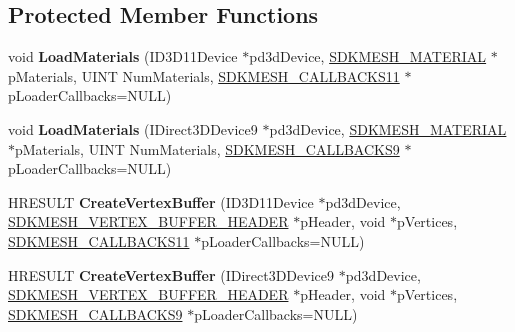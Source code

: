 \subsection*{Protected Member Functions}
\begin{DoxyCompactItemize}
\item 
\hypertarget{class_c_d_x_u_t_s_d_k_mesh_a28a515a0ddc13253ed8dc9cfb2b53b86}{void {\bfseries Load\+Materials} (I\+D3\+D11\+Device $\ast$pd3d\+Device, \hyperlink{struct_s_d_k_m_e_s_h___m_a_t_e_r_i_a_l}{S\+D\+K\+M\+E\+S\+H\+\_\+\+M\+A\+T\+E\+R\+I\+A\+L} $\ast$p\+Materials, U\+I\+N\+T Num\+Materials, \hyperlink{struct_s_d_k_m_e_s_h___c_a_l_l_b_a_c_k_s11}{S\+D\+K\+M\+E\+S\+H\+\_\+\+C\+A\+L\+L\+B\+A\+C\+K\+S11} $\ast$p\+Loader\+Callbacks=N\+U\+L\+L)}\label{class_c_d_x_u_t_s_d_k_mesh_a28a515a0ddc13253ed8dc9cfb2b53b86}

\item 
\hypertarget{class_c_d_x_u_t_s_d_k_mesh_a5f2f31bb0a688d2baa3234aef93fd95a}{void {\bfseries Load\+Materials} (I\+Direct3\+D\+Device9 $\ast$pd3d\+Device, \hyperlink{struct_s_d_k_m_e_s_h___m_a_t_e_r_i_a_l}{S\+D\+K\+M\+E\+S\+H\+\_\+\+M\+A\+T\+E\+R\+I\+A\+L} $\ast$p\+Materials, U\+I\+N\+T Num\+Materials, \hyperlink{struct_s_d_k_m_e_s_h___c_a_l_l_b_a_c_k_s9}{S\+D\+K\+M\+E\+S\+H\+\_\+\+C\+A\+L\+L\+B\+A\+C\+K\+S9} $\ast$p\+Loader\+Callbacks=N\+U\+L\+L)}\label{class_c_d_x_u_t_s_d_k_mesh_a5f2f31bb0a688d2baa3234aef93fd95a}

\item 
\hypertarget{class_c_d_x_u_t_s_d_k_mesh_a5a98aa8652190b3e17696c839028bf4b}{H\+R\+E\+S\+U\+L\+T {\bfseries Create\+Vertex\+Buffer} (I\+D3\+D11\+Device $\ast$pd3d\+Device, \hyperlink{struct_s_d_k_m_e_s_h___v_e_r_t_e_x___b_u_f_f_e_r___h_e_a_d_e_r}{S\+D\+K\+M\+E\+S\+H\+\_\+\+V\+E\+R\+T\+E\+X\+\_\+\+B\+U\+F\+F\+E\+R\+\_\+\+H\+E\+A\+D\+E\+R} $\ast$p\+Header, void $\ast$p\+Vertices, \hyperlink{struct_s_d_k_m_e_s_h___c_a_l_l_b_a_c_k_s11}{S\+D\+K\+M\+E\+S\+H\+\_\+\+C\+A\+L\+L\+B\+A\+C\+K\+S11} $\ast$p\+Loader\+Callbacks=N\+U\+L\+L)}\label{class_c_d_x_u_t_s_d_k_mesh_a5a98aa8652190b3e17696c839028bf4b}

\item 
\hypertarget{class_c_d_x_u_t_s_d_k_mesh_abcb769365649e6338ceab9c5d878fe20}{H\+R\+E\+S\+U\+L\+T {\bfseries Create\+Vertex\+Buffer} (I\+Direct3\+D\+Device9 $\ast$pd3d\+Device, \hyperlink{struct_s_d_k_m_e_s_h___v_e_r_t_e_x___b_u_f_f_e_r___h_e_a_d_e_r}{S\+D\+K\+M\+E\+S\+H\+\_\+\+V\+E\+R\+T\+E\+X\+\_\+\+B\+U\+F\+F\+E\+R\+\_\+\+H\+E\+A\+D\+E\+R} $\ast$p\+Header, void $\ast$p\+Vertices, \hyperlink{struct_s_d_k_m_e_s_h___c_a_l_l_b_a_c_k_s9}{S\+D\+K\+M\+E\+S\+H\+\_\+\+C\+A\+L\+L\+B\+A\+C\+K\+S9} $\ast$p\+Loader\+Callbacks=N\+U\+L\+L)}\label{class_c_d_x_u_t_s_d_k_mesh_abcb769365649e6338ceab9c5d878fe20}


\end{DoxyCompactItemize}
